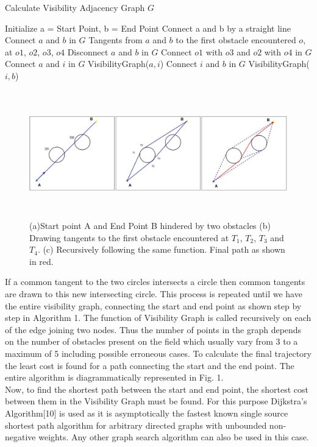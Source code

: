 \documentclass[letterpaper, 10 pt, conference]{ieeeconf}  %
\begin{document}
\begin{algorithm}
\caption{Calculate Visibility Adjacency Graph $G$}
\begin{algorithmic}[1]
\State Initialize a = Start Point, b = End Point
\State Connect a and b by a straight line
\State Connect $a$ and $b$ in $G$ 
\State Tangents from $a$ and $b$ to the first obstacle
encountered $o$, at $o1$, $o2$, $o3$, $o4$
\State Disconnect $a$ and $b$ in $G$
\State Connect $o1$ with $o3$ and $o2$ with $o4$ in $G$
\State Connect $a$ and $i$ in $G$
\State VisibilityGraph($a,i$)
\EndFor
{}
\State Connect $i$ and $b$ in $G$
\State VisibilityGraph($i,b$)
\EndFor
\EndIf
\EndProcedure
\end{algorithmic}
\end{algorithm}



\begin{figure} 
\centering
\includegraphics[width=\textwidth,height=5.5cm]{path_paper.jpg}
\caption{(a)Start point A and End Point B hindered by two obstacles (b) Drawing tangents to the first obstacle encountered at $T_{1}$, $T_{2}$, $T_{3}$ and $T_{4}$. (c) Recursively following the same function. Final path as shown in red. }
\end{figure}


If a common tangent to the two circles intersects a circle then common tangents are drawn to this new intersecting circle. This process is repeated until we have the entire visibility graph, connecting the start and end point as shown step by step in Algorithm 1. The function of Visibility Graph is called recursively on each of the edge joining two nodes. Thus the number of points in the graph depends on the number of obstacles present on the field which usually vary from 3 to a maximum of 5 including possible erroneous cases. To calculate the final trajectory the least cost is found for a path connecting the start and the end point. The entire algorithm is diagrammatically represented in Fig. 1.\\
Now, to find the shortest path between the start and end point, the shortest cost between them in the Visibility Graph must be found. For this purpose Dijkstra's Algorithm[10] is used as it is asymptotically the fastest known single source shortest path algorithm for arbitrary directed graphs with unbounded non-negative weights. Any other graph search algorithm can also be used in this case. 
\end{document}
